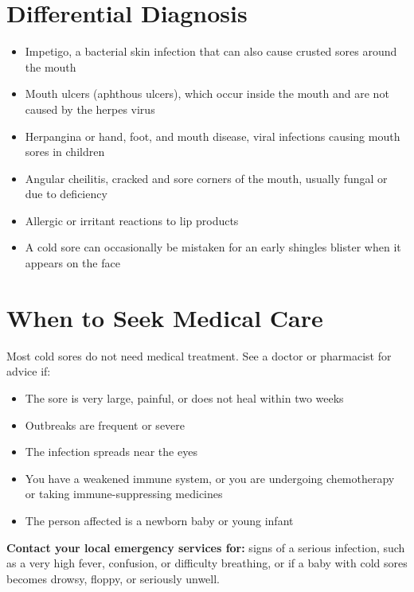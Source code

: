 \section*{Differential Diagnosis}
\begin{itemize}
    \item Impetigo, a bacterial skin infection that can also cause crusted sores around the mouth
    \item Mouth ulcers (aphthous ulcers), which occur inside the mouth and are not caused by the herpes virus
    \item Herpangina or hand, foot, and mouth disease, viral infections causing mouth sores in children
    \item Angular cheilitis, cracked and sore corners of the mouth, usually fungal or due to deficiency
    \item Allergic or irritant reactions to lip products
    \item A cold sore can occasionally be mistaken for an early shingles blister when it appears on the face
\end{itemize}

\section*{When to Seek Medical Care}
Most cold sores do not need medical treatment. See a doctor or pharmacist for advice if:

\begin{itemize}
    \item The sore is very large, painful, or does not heal within two weeks
    \item Outbreaks are frequent or severe
    \item The infection spreads near the eyes
    \item You have a weakened immune system, or you are undergoing chemotherapy or taking immune-suppressing medicines
    \item The person affected is a newborn baby or young infant
\end{itemize}

\textbf{Contact your local emergency services for:} signs of a serious infection, such as a very high fever, confusion, or difficulty breathing, or if a baby with cold sores becomes drowsy, floppy, or seriously unwell.

